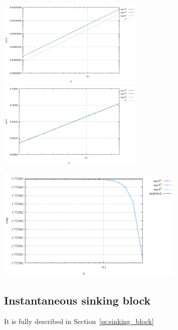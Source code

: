 \begin{center}
\includegraphics[width=7cm]{python_codes/fieldstone_76/results/mms2/errors_v}
\includegraphics[width=7cm]{python_codes/fieldstone_76/results/mms2/errors_p}
\end{center}

\begin{center}
\includegraphics[width=9cm]{python_codes/fieldstone_76/results/mms2/vrms}
\end{center}


\subsection*{Instantaneous sinking block}

It is fully described in Section~\ref{ss:sinking_block}

